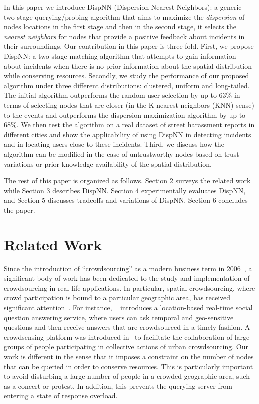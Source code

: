 \documentclass{acm_proc_article-sp}
\begin{document}
In this paper we introduce DispNN (Dispersion-Nearest Neighbors): a generic two-stage querying/probing algorithm that aims to maximize the \textit{dispersion} of nodes locations in the first stage and then in the second stage, it selects the \textit{nearest neighbors} for nodes that provide a positive feedback about incidents in their surroundings. Our contribution in this paper is three-fold. First, we propose DispNN: a two-stage matching algorithm that attempts to gain information about incidents when there is no prior information about the spatial distribution while conserving resources.  Secondly, we study the performance of our proposed algorithm under three different distributions: clustered, uniform and long-tailed. The initial algorithm outperforms the random user selection by up to $63\%$ in terms of selecting nodes that are closer (in the K nearest neighbors (KNN) sense) to the events and outperforms the dispersion maximization algorithm by up to $68\%$. We then test the algorithm on a real dataset of street harassment reports in different cities and show the applicability of using DispNN in detecting incidents and in locating users close to these incidents. Third, we discuss how the algorithm can be modified in the case of untrustworthy nodes based on trust variations or prior knowledge availability of the spatial distribution.\par
The rest of this paper is organized as follows. Section 2 surveys the related work while Section 3 describes DispNN. Section 4 experimentally evaluates DispNN, and Section 5 discusses tradeoffs and variations of DispNN. Section 6 concludes the paper.
\section{Related Work}
Since the introduction of ``crowdsourcing'' as a modern business term in 2006~\cite{howe2006rise}, a significant body of work has been dedicated to the study and implementation of crowdsourcing in real life applications. In particular, spatial crowdsourcing, where crowd participation is bound to a particular geographic area, has received significant attention~\cite{kazemi2012geocrowd, deng2013maximizing, yu2015quality}. For instance, ~\cite{liu2013using} introduces a location-based real-time social question answering service, where users can ask temporal and geo-sensitive questions and then receive answers that are crowdsourced in a timely fashion. A crowdsensing platform was introduced in~\cite{cardone2013fostering} to facilitate the collaboration of large groups of people participating in collective actions of urban crowdsourcing. Our work is different in the sense that it imposes a constraint on the number of nodes that can be queried in order to conserve resources. This is particularly important to avoid disturbing a large number of people in a crowded geographic area, such as a concert or protest. In addition, this prevents the querying server from entering a state of response overload.\par
\end{document}
